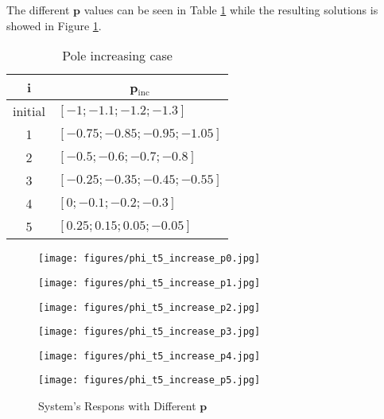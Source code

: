 \documentclass[12pt]{article}
\begin{document}
\newpage
\noindent The different $\textbf{p}$ values can be seen in Table \ref{tab:pinc} while the resulting solutions is showed in Figure \ref{fig:pinc1}.

\begin{table}[htbp]
  \centering
  \caption{Pole increasing case}
  \label{tab:pinc}
  \begin{tabular}{cl}
    \hline
    i &\multicolumn{1}{c}{\textbf{p}$_{\text{inc}}$}\\[0.1cm]
    \hline
    initial & $[-1; -1.1; -1.2; -1.3]$ \\[0.1cm]
    1 & $[-0.75; -0.85; -0.95; -1.05]$\\[0.1cm]
    2 & $[-0.5; -0.6; -0.7; -0.8]$\\[0.1cm]
    3 & $[-0.25; -0.35; -0.45; -0.55]$\\[0.1cm]
    4 & $[0; -0.1; -0.2; -0.3]$\\[0.1cm]
    5 & $[0.25; 0.15; 0.05; -0.05]$
  \end{tabular}
\end{table}

\begin{figure}[htbp]
  \centering
  
  \begin{minipage}[b]{0.3\textwidth}
    \centering
    \texttt{[image: figures/phi\_t5\_increase\_p0.jpg]}
  \end{minipage}%
  \hfill
  \begin{minipage}[b]{0.3\textwidth}
    \centering
    \texttt{[image: figures/phi\_t5\_increase\_p1.jpg]}
  \end{minipage}%
  \hfill
  \begin{minipage}[b]{0.3\textwidth}
    \centering
    \texttt{[image: figures/phi\_t5\_increase\_p2.jpg]}
  \end{minipage}%

  \medskip

  \begin{minipage}[b]{0.3\textwidth}
    \centering
    \texttt{[image: figures/phi\_t5\_increase\_p3.jpg]}
  \end{minipage}%
  \hfill
  \begin{minipage}[b]{0.3\textwidth}
    \centering
    \texttt{[image: figures/phi\_t5\_increase\_p4.jpg]}
  \end{minipage}%
  \hfill
  \begin{minipage}[b]{0.3\textwidth}
    \centering
    \texttt{[image: figures/phi\_t5\_increase\_p5.jpg]}
  \end{minipage}%
  \label{fig:pinc1}
  \caption{System's Respons with Different $\mathbf{p}$}
\end{figure}
\end{document}

